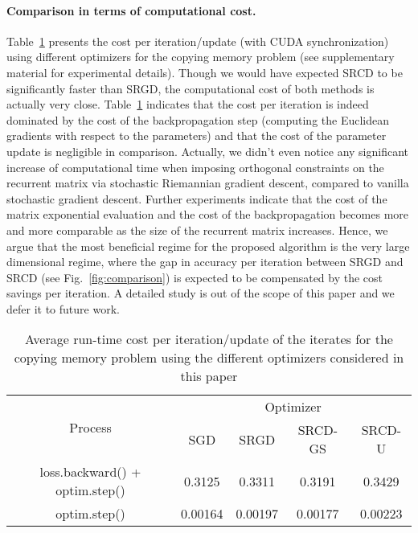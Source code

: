 \documentclass{article}
\begin{document}
\paragraph{Comparison in terms of computational cost.} Table~\ref{tab:time} presents the cost per iteration/update (with CUDA synchronization) using different optimizers for the copying memory problem (see supplementary material for experimental details). Though we would have expected SRCD to be significantly faster than SRGD, the computational cost of both methods is actually very close. Table~\ref{tab:time} indicates that the cost per iteration is indeed dominated by the cost of the backpropagation step (computing the Euclidean gradients with respect to the parameters) and that the cost of the parameter update is negligible in comparison. Actually, we didn't even notice any significant increase of computational time when imposing orthogonal constraints on the recurrent matrix via stochastic Riemannian gradient descent, compared to vanilla stochastic gradient descent.  Further experiments indicate that the cost of the matrix exponential evaluation and the cost of the backpropagation becomes more and more comparable as the size of the recurrent matrix increases. Hence, we argue that the most beneficial regime for the proposed algorithm is the very large dimensional regime, where the gap in accuracy per iteration between SRGD and SRCD (see Fig.~\ref{fig:comparison}) is expected to be compensated by the cost savings  per iteration. A detailed study is out of the scope of this paper and we defer it to future work. 






\begin{table}[t!]
\centering
\caption{Average run-time cost per iteration/update of the iterates for the copying memory problem using the different optimizers considered in this paper}
\begin{tabular}{|c|c|c|c|c|}
\hline
\multicolumn{1}{|c|}{\multirow{2}{*}{Process}} & \multicolumn{4}{c|}{Optimizer} \\ \cline{2-5} 
\multicolumn{1}{|c|}{}  & SGD  & SRGD & SRCD-GS & SRCD-U \\ \hline
loss.backward() + optim.step() &   0.3125   &  0.3311 & 0.3191 &  0.3429 \\ \hline
optim.step()                &   0.00164   &  0.00197    &   0.00177  &  0.00223    \\ \hline
\end{tabular}
\label{tab:time}
\end{table}
\end{document}
